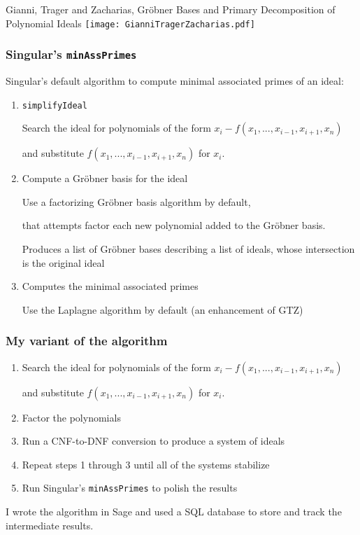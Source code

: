 \documentclass[11pt]{beamer}
\begin{document}
\begin{frame}{Gianni, Trager and Zacharias, Gr\"obner Bases and Primary Decomposition of Polynomial Ideals}
\texttt{[image: GianniTragerZacharias.pdf]}
\end{frame}

\begin{frame}
\frametitle{Singular's {\tt minAssPrimes}}
Singular's default algorithm to compute minimal associated primes of an ideal:
\begin{enumerate}
\item {\tt simplifyIdeal}

Search the ideal for polynomials of the form $x_i-f(x_1,...,x_{i-1},x_{i+1},x_n)$

and substitute $f(x_1,...,x_{i-1},x_{i+1},x_n)$ for $x_i$.

\item Compute a Gr\"obner basis for the ideal

Use a factorizing Gr\"obner basis algorithm by default,

that attempts factor each new polynomial added to the Gr\"obner basis.

Produces a list of Gr\"obner bases describing a list of ideals, whose intersection is the original ideal

\item Computes the minimal associated primes

Use the Laplagne algorithm by default (an enhancement of GTZ)
\end{enumerate}
\end{frame}

\begin{frame}
\frametitle{My variant of the algorithm}
\begin{enumerate}
\item Search the ideal for polynomials of the form $x_i-f(x_1,...,x_{i-1},x_{i+1},x_n)$

and substitute $f(x_1,...,x_{i-1},x_{i+1},x_n)$ for $x_i$.

\item Factor the polynomials

\item Run a CNF-to-DNF conversion to produce a system of ideals

\item Repeat steps 1 through 3 until all of the systems stabilize

\item Run Singular's {\tt minAssPrimes} to polish the results
\end{enumerate}

\vskip 12pt

I wrote the algorithm in Sage and used a SQL database to store and track
the intermediate results.
\end{frame}
\end{document}
